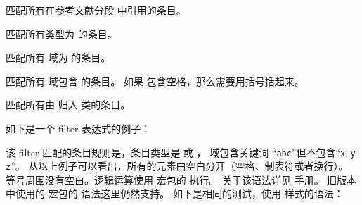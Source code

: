 \begin{optionlist*}



匹配所有在参考文献分段  中引用的条目。



匹配所有类型为  的条目。



匹配所有  域为  的条目。



匹配所有  域包含  的条目。
如果  包含空格，那么需要用括号括起来。



匹配所有由  归入  类的条目。

\end{optionlist*}

如下是一个 filter 表达式的例子：

\begin{ltxexample}[style=latex,keywords={and,or,not,type,keyword}]{}
\end{ltxexample}
%
该 filter 匹配的条目规则是，条目类型是  或 ， 域包含关键词 “\texttt{abc}”但不包含“\texttt{x y z}”。
从以上例子可以看出，所有的元素由空白分开（空格、制表符或者换行）。
等号周围没有空白。逻辑运算使用  宏包的  执行。
关于该语法详见  手册。
\biblatex 旧版本中使用的  宏包的  语法这里仍然支持。
如下是相同的测试，使用  样式的语法：

